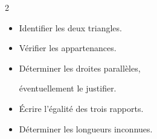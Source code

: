         \begin{methode*1}
            \begin{multicols}2
                \begin{itemize}
                    \item Identifier les deux triangles.                    
                    \item Vérifier les appartenances.                     
                    \item Déterminer les droites parallèles,
                    
                    éventuellement le justifier.                    
                    \item Écrire l'égalité des trois rapports.
                    \item Déterminer les longueurs inconnues.
                \end{itemize}
            \end{multicols}

            \exercice


\end{methode*1}
